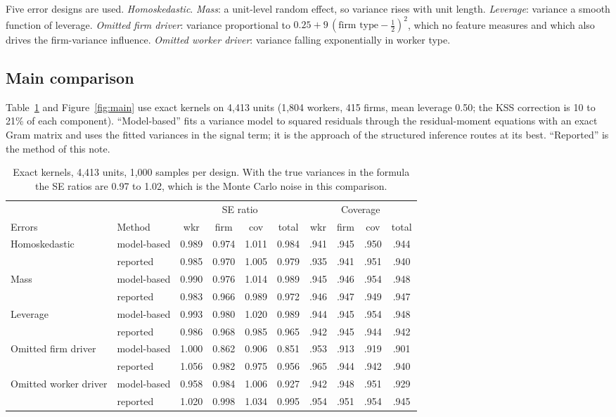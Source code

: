 \documentclass[11pt]{article}
\begin{document}
Five error designs are used. \emph{Homoskedastic}. \emph{Mass}: a
unit-level random effect, so variance rises with unit length.
\emph{Leverage}: variance a smooth function of leverage. \emph{Omitted firm
driver}: variance proportional to $0.25+9\,(\text{firm type}-\tfrac12)^2$,
which no feature measures and which also drives the firm-variance influence.
\emph{Omitted worker driver}: variance falling exponentially in worker type.

\subsection{Main comparison}\label{sec:evidence-main}

Table~\ref{tab:main} and Figure~\ref{fig:main} use exact kernels on 4,413
units (1,804 workers, 415 firms, mean leverage 0.50; the KSS correction is
10 to 21\% of each component). ``Model-based'' fits a variance model to
squared residuals through the residual-moment equations with an exact Gram
matrix and uses the fitted variances in the signal term; it is the approach
of the structured inference routes at its best. ``Reported'' is the method of
this note.

\begin{table}[ht]
\centering\small
\begin{tabular}{@{}llcccc@{\hskip 1.2em}cccc@{}}
\toprule
 & & \multicolumn{4}{c}{SE ratio} & \multicolumn{4}{c}{Coverage} \\
Errors & Method & wkr & firm & cov & total & wkr & firm & cov & total \\
\midrule
Homoskedastic & model-based & 0.989 & 0.974 & 1.011 & 0.984 & .941 & .945 & .950 & .944 \\
 & reported & 0.985 & 0.970 & 1.005 & 0.979 & .935 & .941 & .951 & .940 \\
Mass & model-based & 0.990 & 0.976 & 1.014 & 0.989 & .945 & .946 & .954 & .948 \\
 & reported & 0.983 & 0.966 & 0.989 & 0.972 & .946 & .947 & .949 & .947 \\
Leverage & model-based & 0.993 & 0.980 & 1.020 & 0.989 & .944 & .945 & .954 & .948 \\
 & reported & 0.986 & 0.968 & 0.985 & 0.965 & .942 & .945 & .944 & .942 \\
Omitted firm driver & model-based & 1.000 & 0.862 & 0.906 & 0.851 & .953 & .913 & .919 & .901 \\
 & reported & 1.056 & 0.982 & 0.975 & 0.956 & .965 & .944 & .942 & .940 \\
Omitted worker driver & model-based & 0.958 & 0.984 & 1.006 & 0.927 & .942 & .948 & .951 & .929 \\
 & reported & 1.020 & 0.998 & 1.034 & 0.995 & .954 & .951 & .954 & .945 \\
\bottomrule
\end{tabular}
\caption{Exact kernels, 4,413 units, 1,000 samples per design. With the true
variances in the formula the SE ratios are 0.97 to 1.02, which is the Monte
Carlo noise in this comparison.}\label{tab:main}
\end{table}
\end{document}

